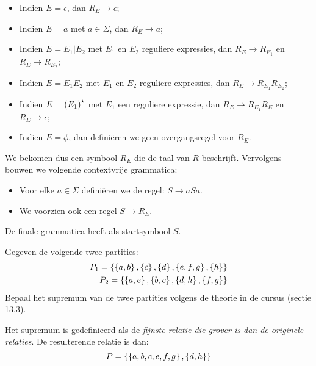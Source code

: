 \documentclass{article}
\begin{document}
\begin{answer}
\begin{enumerate}
 \begin{itemize}
  \item Indien $E=\epsilon$, dan $R_E\rightarrow\epsilon$;
  \item Indien $E=a$ met $a\in\Sigma$, dan $R_E\rightarrow a$;
  \item Indien $E=E_1|E_2$ met $E_1$ en $E_2$ reguliere expressies, dan $R_E\rightarrow R_{E_1}$ en $R_E\rightarrow R_{E_2}$;
  \item Indien $E=E_1E_2$ met $E_1$ en $E_2$ reguliere expressies, dan $R_E\rightarrow R_{E_1}R_{E_2}$;
  \item Indien $E=\left( E_1 \right)^\star$ met $E_1$ een reguliere expressie, dan $R_E\rightarrow R_{E_1}R_E$ en $R_E\rightarrow \epsilon$;
  \item Indien $E=\phi$, dan defini\"eren we geen overgangsregel voor $R_E$.
 \end{itemize}
We bekomen dus een symbool $R_E$ die de taal van $R$ beschrijft. Vervolgens bouwen we volgende contextvrije grammatica:
\begin{itemize}
 \item Voor elke $a\in\Sigma$ defini\"eren we de regel: $S\rightarrow aSa$.
 \item We voorzien ook een regel $S\rightarrow R_E$.
\end{itemize}
De finale grammatica heeft als startsymbool $S$.
\end{enumerate}
\end{answer}
\begin{question}
Gegeven de volgende twee partities:
\begin{eqnarray}
P_1=\left\{ \left\{ a,b \right\},\left\{ c \right\},\left\{ d \right\},\left\{ e,f,g \right\},\left\{ h \right\}  \right\}\\
P_2=\left\{ \left\{ a,e \right\},\left\{ b,c \right\},\left\{ d,h \right\},\left\{ f,g \right\}  \right\}
\end{eqnarray}
Bepaal het supremum van de twee partities volgens de theorie in de cursus (sectie 13.3).
\end{question}
\begin{answer}
Het supremum is gedefinieerd als de \emph{fijnste relatie die grover is dan de originele relaties}. De resulterende relatie is dan:
\begin{equation}
P=\left\{ \left\{ a,b,c,e,f,g \right\},\left\{ d,h \right\}  \right\}
\end{equation}
\end{answer}
\end{document}
